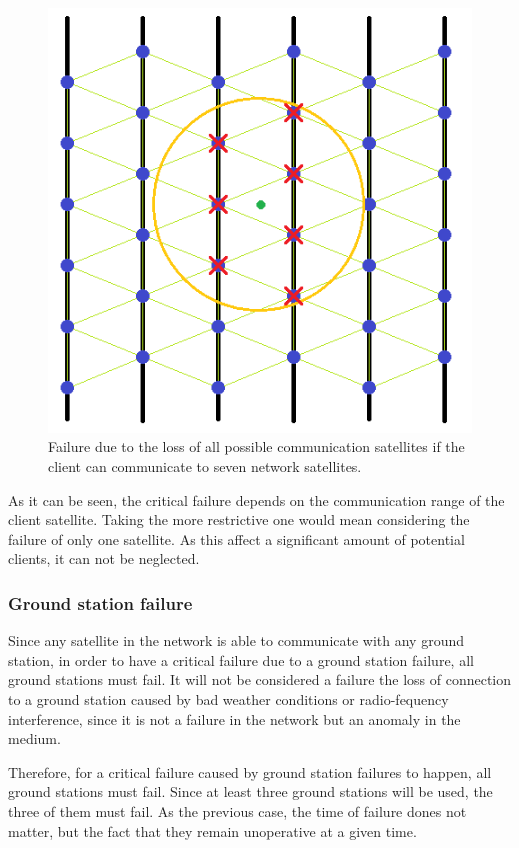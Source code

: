 \begin{figure}[H]
\begin{center}
\includegraphics[scale=0.5]{critical3.PNG}
\caption[7 communication range failure]{Failure due to the loss of all possible communication satellites if the client can communicate to seven network satellites.}
\label{fig:critical3}
\end{center}
\end{figure}

As it can be seen, the critical failure depends on the communication range of the client satellite. Taking the more restrictive one would mean considering the failure of only one satellite. As this affect a significant amount of potential clients, it can not be neglected.

\subsubsection{Ground station failure}
Since any satellite in the network is able to communicate with any ground station, in order to have a critical failure due to a ground station failure, all ground stations must fail. It will not be considered a failure the loss of connection to a ground station caused by bad weather conditions or radio-fequency interference, since it is not a failure in the network but an anomaly in the medium.

Therefore, for a critical failure caused by ground station failures to happen, all ground stations must fail. Since at least three ground stations will be used, the three of them must fail. As the previous case, the time of failure dones not matter, but the fact that they remain unoperative at a given time.

